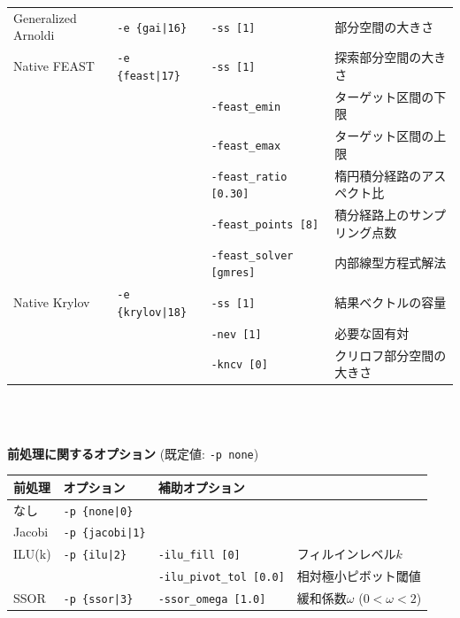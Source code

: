 \documentclass[a4paper]{jarticle}
\begin{document}
{{\begin{minipage}[t]{\textwidth}
\begin{center}
\begin{tabular}{l|lll}
 Generalized Arnoldi    & \verb=-e {gai|16}=       &    \verb=-ss [1]= & 部分空間の大きさ \\ 
 Native FEAST                      & \verb=-e {feast|17}=    &
 \verb=-ss [1]= & 探索部分空間の大きさ \\
                                   &                         &
 \verb=-feast_emin= & ターゲット区間の下限 \\
                                   &                         &
 \verb=-feast_emax= & ターゲット区間の上限 \\
                                   &                         &
 \verb=-feast_ratio [0.30]= & 楕円積分経路のアスペクト比 \\
                                   &                         &
 \verb=-feast_points [8]= & 積分経路上のサンプリング点数 \\
                                   &                         &
 \verb=-feast_solver [gmres]= & 内部線型方程式解法 \\
 Native Krylov                      & \verb=-e {krylov|18}= &
 \verb=-ss [1]= & 結果ベクトルの容量 \\
                                    &                        &
 \verb=-nev [1]= & 必要な固有対 \\
                                    &                        &
 \verb=-kncv [0]= & クリロフ部分空間の大きさ \\
 \hline         
\end{tabular}
\end{center}
\end{minipage}
\\ \\
\begin{minipage}[t]{\textwidth}
\begin{center}
{\bf 前処理に関するオプション} (既定値: \verb=-p none=) \\
\begin{tabular}{l|lll}\hline\hline
前処理   & オプション           & 補助オプション \\ \hline
なし     & \verb=-p {none|0}=    &   \\
Jacobi   & \verb=-p {jacobi|1}=  &     \\
ILU(k)   & \verb=-p {ilu|2}=     & \verb=-ilu_fill [0]=    & フィルインレベル$k$ \\
         &                       & \verb=-ilu_pivot_tol [0.0]= & 相対極小ピボット閾値 \\
SSOR     & \verb=-p {ssor|3}=    & \verb=-ssor_omega [1.0]=    & 緩和係数$\omega$ ($0<\omega<2$) \\

\end{tabular}
\end{center}
\end{minipage}}}
\end{document}
